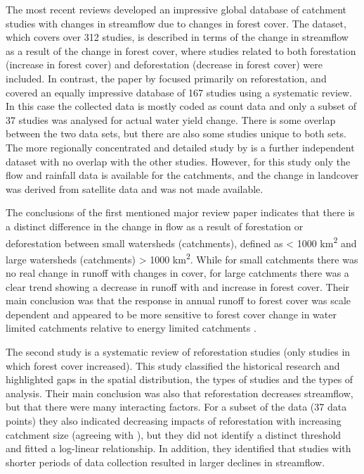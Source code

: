 \documentclass[]{elsarticle} %
\begin{document}
The most recent reviews \citep{zhang2017, filoso2017} developed an impressive global database of catchment studies with changes in streamflow due to changes in forest cover. The \citet{zhang2017} dataset, which covers over 312 studies, is described in terms of the change in streamflow as a result of the change in forest cover, where studies related to both forestation (increase in forest cover) and deforestation (decrease in forest cover) were included. In contrast, the paper by \citet{filoso2017} focused primarily on reforestation, and covered an equally impressive database of 167 studies using a systematic review. In this case the collected data is mostly coded as count data and only a subset of 37 studies was analysed for actual water yield change. There is some overlap between the two data sets, but there are also some studies unique to both sets. The more regionally concentrated and detailed study by \citet{levy2018} is a further independent dataset with no overlap with the other studies. However, for this study only the flow and rainfall data is available for the catchments, and the change in landcover was derived from satellite data and was not made available.

The conclusions of the first mentioned major review paper \citep{zhang2017} indicates that there is a distinct difference in the change in flow as a result of forestation or deforestation between small watersheds (catchments), defined as \textless{} 1000 km\textsuperscript{2} and large watersheds (catchments) \textgreater{} 1000 km\textsuperscript{2}. While for small catchments there was no real change in runoff with changes in cover, for large catchments there was a clear trend showing a decrease in runoff with and increase in forest cover. Their main conclusion was that the response in annual runoff to forest cover was scale dependent and appeared to be more sensitive to forest cover change in water limited catchments relative to energy limited catchments \citep{zhang2017}.

The second study \citep{filoso2017} is a systematic review of reforestation studies (only studies in which forest cover increased). This study classified the historical research and highlighted gaps in the spatial distribution, the types of studies and the types of analysis. Their main conclusion was also that reforestation decreases streamflow, but that there were many interacting factors. For a subset of the data (37 data points) they also indicated decreasing impacts of reforestation with increasing catchment size (agreeing with \citet{zhang2017}), but they did not identify a distinct threshold and fitted a log-linear relationship. In addition, they identified that studies with shorter periods of data collection resulted in larger declines in streamflow.
\end{document}
